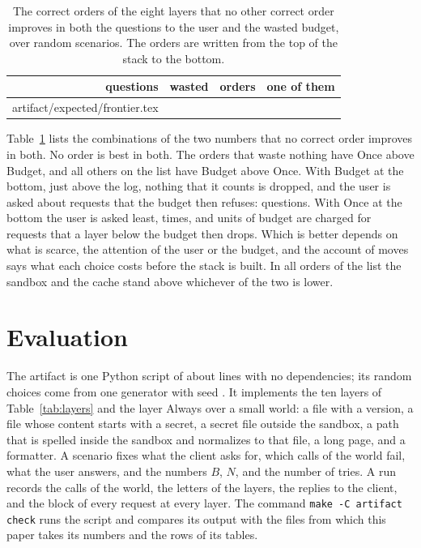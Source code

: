 \documentclass[acmsmall,nonacm,screen]{acmart}
\makeatletter
\newcommand{\ly}[1]{\textsf{#1}}
\newcommand{\claim}[2]{#2}
\newcommand{\rows}[1]{\@@input artifact/expected/#1.tex }
\makeatother
\begin{document}
\begin{table}
\caption{The correct orders of the eight layers that no other correct order improves in both
the questions to the user and the wasted budget, over \exWork{} random scenarios. The orders
are written from the top of the stack to the bottom.}
\label{tab:frontier}
\small
\begin{tabular}{rrrl}
\toprule
questions & wasted & orders & one of them \\
\midrule
\rows{frontier}
\bottomrule
\end{tabular}
\end{table}

Table~\ref{tab:frontier} lists the \exFrontier{} combinations of the two numbers that no
correct order improves in both. \claim{frontier}{No order is best in both. The orders that
waste nothing have \ly{Once} above \ly{Budget}, and all others on the list have \ly{Budget}
above \ly{Once}.} With \ly{Budget} at the bottom, just above the log, nothing that it counts
is dropped, and the user is asked about requests that the budget then refuses:
\exAskedNoWaste{} questions. With \ly{Once} at the bottom the user is asked least,
\exAskedLeast{} times, and \exWasteLeastAsked{} units of budget are charged for requests that
a layer below the budget then drops. Which is better depends on what is scarce, the attention of the user or
the budget, and the account of moves says what each choice costs before the stack is built. In
all orders of the list the sandbox and the cache stand above whichever of the two is lower.

\section{Evaluation}
\label{sec:eval}

The artifact is one Python script of about \exLines{} lines with no dependencies; its random
choices come from one generator with seed \exSeed{}. It
implements the ten layers of Table~\ref{tab:layers} and the layer \ly{Always} over a small
world: a file with a version, a file whose content starts with a secret, a secret file
outside the sandbox, a path that is spelled inside the sandbox and normalizes to that file, a
long page, and a formatter. A scenario fixes what the client asks for, which calls of the
world fail, what the user answers, and the numbers $B$, $N$, and the number of tries. A run
records the calls of the world, the letters of the layers, the replies to the client, and the
block of every request at every layer. The command \texttt{make -C artifact check} runs the
script and compares its output with the files from which this paper takes its numbers and
the rows of its tables.
\end{document}
